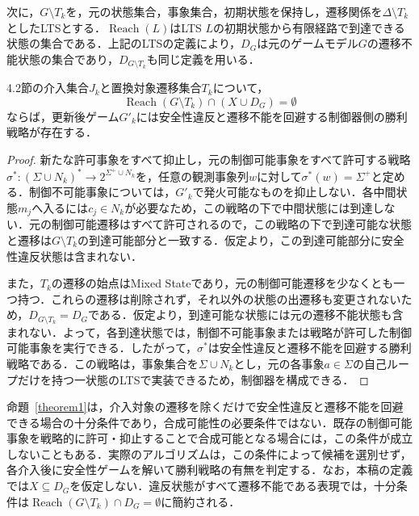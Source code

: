 次に，$G\setminus T_k$を，元の状態集合，事象集合，初期状態を保持し，遷移関係を$\Delta\setminus T_k$としたLTSとする．$\operatorname{Reach}(L)$はLTS $L$の初期状態から有限経路で到達できる状態の集合である．上記のLTSの定義により，$D_G$は元のゲームモデル$G$の遷移不能状態の集合であり，$D_{G\setminus T_k}$も同じ定義を用いる．

\begin{theorem}[既存事象を制限しない十分条件]
\label{theorem1}

4.2節の介入集合$J_k$と置換対象遷移集合$T_k$について，
\[
\operatorname{Reach}(G\setminus T_k)\cap(X\cup D_G)=\emptyset
\]
ならば，更新後ゲーム$G'_k$には安全性違反と遷移不能を回避する制御器側の勝利戦略が存在する．
\end{theorem}

\begin{proof}
新たな許可事象をすべて抑止し，元の制御可能事象をすべて許可する戦略$\sigma^*:(\Sigma\cup N_k)^*\to2^{\Sigma^{+}\cup N_k}$を，任意の観測事象列$w$に対して$\sigma^*(w)=\Sigma^{+}$と定める．制御不可能事象については，$G'_k$で発火可能なものを抑止しない．各中間状態$m_j$へ入るには$c_j\in N_k$が必要なため，この戦略の下で中間状態には到達しない．元の制御可能遷移はすべて許可されるので，この戦略の下で到達可能な状態と遷移は$G\setminus T_k$の到達可能部分と一致する．仮定より，この到達可能部分に安全性違反状態は含まれない．

また，$T_k$の遷移の始点はMixed Stateであり，元の制御可能遷移を少なくとも一つ持つ．これらの遷移は削除されず，それ以外の状態の出遷移も変更されないため，$D_{G\setminus T_k}=D_G$である．仮定より，到達可能な状態には元の遷移不能状態も含まれない．よって，各到達状態では，制御不可能事象または戦略が許可した制御可能事象を実行できる．したがって，$\sigma^*$は安全性違反と遷移不能を回避する勝利戦略である．この戦略は，事象集合を$\Sigma\cup N_k$とし，元の各事象$a\in\Sigma$の自己ループだけを持つ一状態のLTSで実装できるため，制御器を構成できる．
\end{proof}

命題~\ref{theorem1}は，介入対象の遷移を除くだけで安全性違反と遷移不能を回避できる場合の十分条件であり，合成可能性の必要条件ではない．既存の制御可能事象を戦略的に許可・抑止することで合成可能となる場合には，この条件が成立しないこともある．実際のアルゴリズムは，この条件によって候補を選別せず，各介入後に安全性ゲームを解いて勝利戦略の有無を判定する．なお，本稿の定義では$X\subseteq D_G$を仮定しない．違反状態がすべて遷移不能である表現では，十分条件は$\operatorname{Reach}(G\setminus T_k)\cap D_G=\emptyset$に簡約される．

